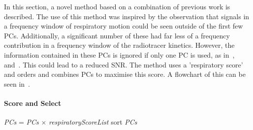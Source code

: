                 In this section, a novel method based on a combination of previous work is described. The use of this method was inspired by the observation that signals in a frequency window of respiratory motion could be seen outside of the first few \glspl{PC}. Additionally, a significant number of these had far less of a frequency contribution in a frequency window of the radiotracer kinetics. However, the information contained in these \glspl{PC} is ignored if only one \gls{PC} is used, as in~\parencite{Thielemans2011}, and~\parencite{Bertolli2018Data-DrivenTomography}. This could lead to a reduced \gls{SNR}. The method uses a 'respiratory score' and orders and combines \glspl{PC} to maximise this score. A flowchart of this can be seen in~.
                    
                \paragraph{Score and Select} \label{sec:pca_data_driven_surrogate_signal_extraction_methods_for_dynamic_pet_methods_score_select_and_combine_method_score_and_select}
                    \begin{algorithm}
                        \caption{Score and Select \glspl{PC}}
                        \;
                        \;
                        \textit{PCs} = \textit{PCs} $\times$ \textit{respiratoryScoreList}\;
                        sort \textit{PCs}\;
                        \;
        
                        \label{alg:pca_data_driven_surrogate_signal_extraction_methods_for_dynamic_pet_methods_score_select_and_combine_method_score_and_select_score_and_select_pseudo_code}
                    \end{algorithm}
        
